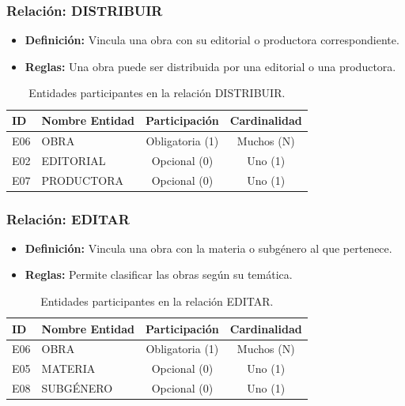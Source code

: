 	\subsubsection{Relación: DISTRIBUIR}
	\begin{itemize}
		\item\textbf{Definición:} Vincula una obra con su editorial o productora correspondiente.
		\item\textbf{Reglas:} Una obra puede ser distribuida por una editorial o una productora.
	\end{itemize}
	
	\begin{table}[H]
		\centering
		\caption{Entidades participantes en la relación DISTRIBUIR.}
		\label{tab:rel_distribuir}
		\small
		\begin{tabularx}{\textwidth}{X l c c}
			\toprule
			\textbf{ID} & \textbf{Nombre Entidad} & \textbf{Participación} & \textbf{Cardinalidad} \\
			\midrule
			E06 & OBRA & Obligatoria (1) & Muchos (N) \\
			\addlinespace
			E02 & EDITORIAL & Opcional (0) & Uno (1) \\
			\addlinespace
			E07 & PRODUCTORA & Opcional (0) & Uno (1) \\
			\bottomrule
		\end{tabularx}
	\end{table}
	
	\subsubsection{Relación: EDITAR}
	\begin{itemize}
		\item\textbf{Definición:} Vincula una obra con la materia o subgénero al que pertenece.
		\item\textbf{Reglas:} Permite clasificar las obras según su temática.
	\end{itemize}
	
	\begin{table}[H]
		\centering
		\caption{Entidades participantes en la relación EDITAR.}
		\label{tab:rel_editar}
		\small
		\begin{tabularx}{\textwidth}{X l c c}
			\toprule
			\textbf{ID} & \textbf{Nombre Entidad} & \textbf{Participación} & \textbf{Cardinalidad} \\
			\midrule
			E06 & OBRA & Obligatoria (1) & Muchos (N) \\
			\addlinespace
			E05 & MATERIA & Opcional (0) & Uno (1) \\
			\addlinespace
			E08 & SUBGÉNERO & Opcional (0) & Uno (1) \\
			\bottomrule
		\end{tabularx}
	\end{table}
	
